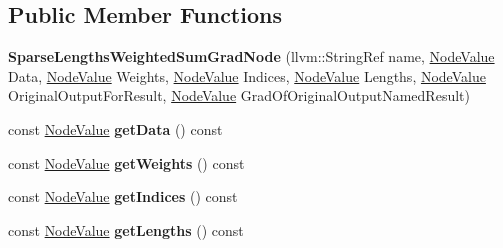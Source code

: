 \subsection*{Public Member Functions}
\begin{DoxyCompactItemize}
\item 
\mbox{\label{classglow_1_1_sparse_lengths_weighted_sum_grad_node_aa815729f00e7bf2735de8faad5818b85}} 
{\bfseries Sparse\+Lengths\+Weighted\+Sum\+Grad\+Node} (llvm\+::\+String\+Ref name, \hyperlink{structglow_1_1_node_value}{Node\+Value} Data, \hyperlink{structglow_1_1_node_value}{Node\+Value} Weights, \hyperlink{structglow_1_1_node_value}{Node\+Value} Indices, \hyperlink{structglow_1_1_node_value}{Node\+Value} Lengths, \hyperlink{structglow_1_1_node_value}{Node\+Value} Original\+Output\+For\+Result, \hyperlink{structglow_1_1_node_value}{Node\+Value} Grad\+Of\+Original\+Output\+Named\+Result)
\item 
\mbox{\label{classglow_1_1_sparse_lengths_weighted_sum_grad_node_ac857e9b1ffdf0f7f618fa0fdb16fb47e}} 
const \hyperlink{structglow_1_1_node_value}{Node\+Value} {\bfseries get\+Data} () const
\item 
\mbox{\label{classglow_1_1_sparse_lengths_weighted_sum_grad_node_ab78bb97e83ba9b7ba85ddfe15f5d03b7}} 
const \hyperlink{structglow_1_1_node_value}{Node\+Value} {\bfseries get\+Weights} () const
\item 
\mbox{\label{classglow_1_1_sparse_lengths_weighted_sum_grad_node_acf0b8b5b1da3058b6e32e08dd8eec00b}} 
const \hyperlink{structglow_1_1_node_value}{Node\+Value} {\bfseries get\+Indices} () const
\item 
\mbox{\label{classglow_1_1_sparse_lengths_weighted_sum_grad_node_a58d5fb243533562d07b4317a4544806f}} 
const \hyperlink{structglow_1_1_node_value}{Node\+Value} {\bfseries get\+Lengths} () const
\item 
\mbox{\label{classglow_1_1_sparse_lengths_weighted_sum_grad_node_ad603f91baf54579ded1e5d95f310b30b}} 

\end{DoxyCompactItemize}
